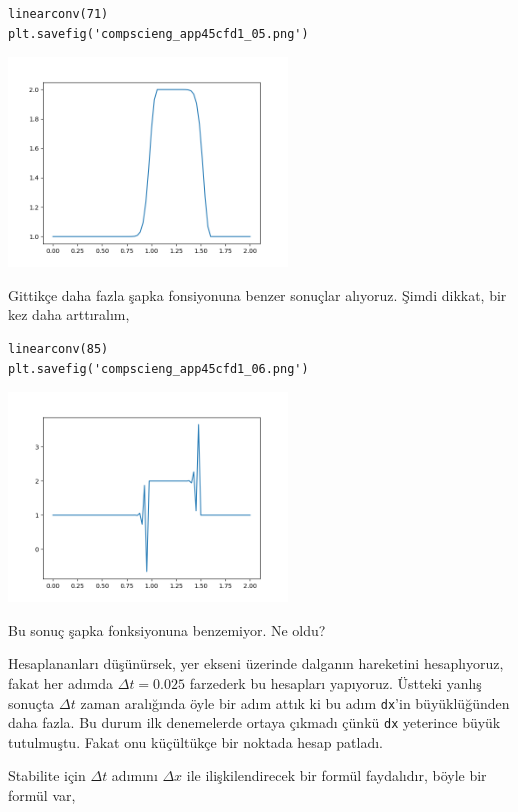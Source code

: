 \documentclass[12pt,fleqn]{article}\usepackage{../../common}
\begin{document}
\begin{verbatim}
linearconv(71)
plt.savefig('compscieng_app45cfd1_05.png')
\end{verbatim}

\includegraphics[width=20em]{compscieng_app45cfd1_05.png}

Gittikçe daha fazla şapka fonsiyonuna benzer sonuçlar alıyoruz. Şimdi dikkat,
bir kez daha arttıralım,

\begin{verbatim}
linearconv(85)
plt.savefig('compscieng_app45cfd1_06.png')
\end{verbatim}

\includegraphics[width=20em]{compscieng_app45cfd1_06.png}

Bu sonuç şapka fonksiyonuna benzemiyor. Ne oldu?

Hesaplananları düşünürsek, yer ekseni üzerinde dalganın hareketini hesaplıyoruz,
fakat her adımda $\Delta t = 0.025$ farzederk bu hesapları yapıyoruz. Üstteki
yanlış sonuçta $\Delta t$ zaman aralığında öyle bir adım attık ki bu adım
\verb!dx!'in büyüklüğünden daha fazla. Bu durum ilk denemelerde ortaya çıkmadı
çünkü \verb!dx! yeterince büyük tutulmuştu. Fakat onu küçültükçe bir noktada
hesap patladı.

Stabilite için $\Delta t$ adımını $\Delta x$ ile ilişkilendirecek bir formül
faydalıdır, böyle bir formül var,
\end{document}
